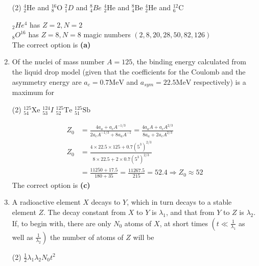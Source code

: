 \begin{enumerate}
{}
\begin{tasks}(2)
	\task[\textbf{A.}] ${ }_{2}^{4} \mathrm{He}$ and ${ }_{8}^{16} \mathrm{O}$
	\task[\textbf{B.}]${ }_{1}^{2} D$ and ${ }_{4}^{8} B e$
	\task[\textbf{C.}]${ }_{2}^{4} \mathrm{He}$ and ${ }_{4}^{8} \mathrm{Be}$
	\task[\textbf{D.}]${ }_{2}^{4} \mathrm{He}$ and ${ }_{6}^{12} \mathrm{C}$
\end{tasks}
\begin{answer}
	${ }_{2} H e^{4}$ has $Z=2, N=2$\\
	${ }_{8} O^{16}$ has $Z=8, N=8$ magic numbers $(2,8,20,28,50,82,126)$\\
	The correct option is \textbf{(a)}
\end{answer}
\item Of the nuclei of mass number $A=125$, the binding energy calculated from the liquid drop model (given that the coefficients for the Coulomb and the asymmetry energy are $a_{c}=0.7 \mathrm{MeV}$ and $a_{s y m}=22.5 \mathrm{MeV}$ respectively) is a maximum for
{}
\begin{tasks}(2)
	\task[\textbf{A.}] ${ }_{54}^{125} \mathrm{Xe}$
	\task[\textbf{B.}] ${ }_{53}^{124} I$
	\task[\textbf{C.}]${ }_{52}^{125} \mathrm{Te}$
	\task[\textbf{D.}]${ }_{51}^{125} \mathrm{Sb}$
\end{tasks}
\begin{answer}
	\begin{align*}
	Z_{0}&=\frac{4 a_{a}+a_{c} A^{-1 / 3}}{2 a_{c} A^{-1 / 3}+8 a_{a} A^{-1}}=\frac{4 a_{a} A+a_{c} A^{2 / 3}}{8 a_{a}+2 a_{c} A^{2 / 3}}\\
	Z_{0}&=\frac{4 \times 22.5 \times 125+0.7\left(5^{3}\right)^{2 / 3}}{8 \times 22.5+2 \times 0.7\left(5^{3}\right)^{2 / 3}}\\
	&=\frac{11250+17.5}{180+35}=\frac{11267.5}{215}=52.4 \Rightarrow Z_{0} \approx 52
	\end{align*}
	The correct option is \textbf{(c)}
\end{answer}
\item A radioactive element $X$ decays to $Y$, which in turn decays to a stable element $Z$. The decay constant from $X$ to $Y$ is $\lambda_{1}$, and that from $Y$ to $Z$ is $\lambda_{2}$. If, to begin with, there are only $N_{0}$ atoms of $X$, at short times $\left(t \ll \frac{1}{\lambda_{1}}\right.$ as well as $\left.\frac{1}{\lambda_{2}}\right)$ the number of atoms of $Z$ will be
{}
\begin{tasks}(2)
	\task[\textbf{A.}] $\frac{1}{2} \lambda_{1} \lambda_{2} N_{0} t^{2}$

\end{tasks}
\end{enumerate}
